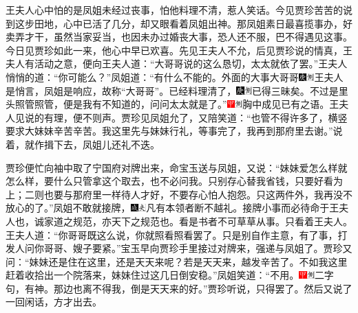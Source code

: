 王夫人心中怕的是凤姐未经过丧事，怕他料理不清，惹人笑话。今见贾珍苦苦的说到这步田地，心中已活了几分，却又眼看着凤姐出神。那凤姐素日最喜揽事办，好卖弄才干，虽然当家妥当，也因未办过婚丧大事，恐人还不服，巴不得遇见这事。今日见贾珍如此一来，他心中早已欢喜。先见王夫人不允，后见贾珍说的情真，王夫人有活动之意，便向王夫人道：``大哥哥说的这么恳切，太太就依了罢。''王夫人悄悄的道：``你可能么？''凤姐道：``有什么不能的。外面的大事大哥哥{\includegraphics[width=3mm]{../Images/00004}\includegraphics[width=3mm]{../Images/00011}\footnotesize \kaishu 王夫人是悄言，凤姐是响应，故称``大哥哥''。}已经料理清了，{\includegraphics[width=3mm]{../Images/00004}\includegraphics[width=3mm]{../Images/00011}\footnotesize \kaishu 已得三昧矣。}不过是里头照管照管，便是我有不知道的，问问太太就是了。''{\includegraphics[width=3mm]{../Images/00002}\includegraphics[width=3mm]{../Images/00011}\footnotesize \kaishu 胸中成见已有之语。}王夫人见说的有理，便不则声。贾珍见凤姐允了，又陪笑道：``也管不得许多了，横竖要求大妹妹辛苦辛苦。我这里先与妹妹行礼，等事完了，我再到那府里去谢。''说着，就作揖下去，凤姐儿还礼不迭。

贾珍便忙向袖中取了宁国府对牌出来，命宝玉送与凤姐，又说：``妹妹爱怎么样就怎么样，要什么只管拿这个取去，也不必问我。只别存心替我省钱，只要好看为上；二则也要与那府里一样待人才好，不要存心怕人抱怨。只这两件外，我再没不放心的了。''凤姐不敢就接牌，{\includegraphics[width=3mm]{../Images/00005}\includegraphics[width=3mm]{../Images/00012}\footnotesize \kaishu 凡有本领者断不越礼。接牌小事而必待命于王夫人也，诚家道之规范，亦天下之规范也。看是书者不可草草从事。}只看着王夫人。王夫人道：``你哥哥既这么说，你就照看照看罢了。只是别自作主意，有了事，打发人问你哥哥、嫂子要紧。''宝玉早向贾珍手里接过对牌来，强递与凤姐了。贾珍又问：``妹妹还是住在这里，还是天天来呢？若是天天来，越发辛苦了。不如我这里赶着收拾出一个院落来，妹妹住过这几日倒安稳。''凤姐笑道：``不用。{\includegraphics[width=3mm]{../Images/00002}\includegraphics[width=3mm]{../Images/00011}\footnotesize \kaishu 二字句，有神。}那边也离不得我，倒是天天来的好。''贾珍听说，只得罢了。然后又说了一回闲话，方才出去。

